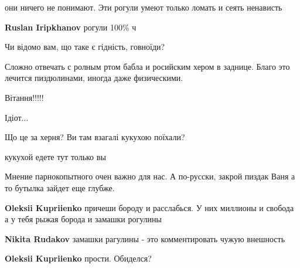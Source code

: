 \begin{itemize}
\begin{itemize}
\begin{itemize}
\end{itemize} %


они ничего не понимают. Эти рогули умеют только ломать и сеять ненависть

\begin{itemize} %
\textbf{Ruslan Iripkhanov} рогули 100\% ч
\end{itemize} %

\end{itemize} %

Чи відомо вам, що таке є гідність, говноїди?

\begin{itemize} %
Сложно отвечать с ролным ртом бабла и росийским хером в заднице.
Благо это лечится пиздюлинами, иногда даже физическими.
\end{itemize} %


Вітання!!!!!

\begin{itemize} %
Ідіот...
\end{itemize} %

Що це за херня? Ви там взагалі кукухою поїхали?

\begin{itemize} %
кукухой едете тут только вы

Мнение парнокопытного очен важно для нас.
А по-русски, закрой пиздак Ваня а то бутылка зайдет еще глубже.

\textbf{Oleksii Kupriienko} причеши бороду и расслабься. У них миллионы и свобода а у тебя рыжая борода и замашки рогулины

\begin{itemize} %
\textbf{Nikita Rudakov} замашки рагулины - это комментировать чужую внешность

\textbf{Oleksii Kupriienko} прости. Обиделся?
\end{itemize} %

\end{itemize} %


\end{itemize}
